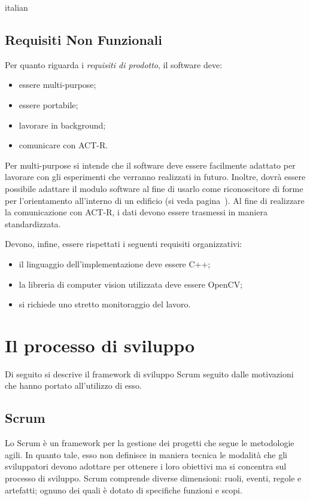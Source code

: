 \begin{otherlanguage*}{italian}
		\subsection*{Requisiti Non Funzionali}
			Per quanto riguarda i \emph{requisiti di prodotto}, il software deve:
			\begin{itemize}
				\item essere multi-purpose;
				\item essere portabile;
			   \item lavorare in background;			
				\item comunicare con \mbox{ACT-R}.			
			\end{itemize}
			
		Per multi-purpose si intende che il software deve essere facilmente adattato per lavorare con gli esperimenti che verranno realizzati in futuro.
		Inoltre, dovrà essere possibile adattare il modulo software al fine di usarlo come riconoscitore di forme per l'orientamento all'interno di un edificio (si veda pagina~\pageref{obiettivi}).
		Al fine di realizzare la comunicazione con \mbox{ACT-R}, i dati devono essere trasmessi in maniera standardizzata.

		Devono, infine, essere rispettati i seguenti requisiti organizzativi:
		\begin{itemize}
				\item il linguaggio dell'implementazione deve essere C++;
				\item la libreria di computer vision utilizzata deve essere \mbox{OpenCV};
			   \item si richiede uno stretto monitoraggio del lavoro.					
			\end{itemize}	

	\section*{Il processo di sviluppo}
		Di seguito si descrive il framework di sviluppo Scrum seguito dalle motivazioni che hanno portato all'utilizzo di esso.
		
		\subsection*{Scrum}
			Lo Scrum è un framework per la gestione dei progetti che segue le metodologie agili.
			In quanto tale, esso non definisce in maniera tecnica le modalità che gli sviluppatori devono adottare per ottenere i loro obiettivi ma si concentra sul processo di sviluppo.
			Scrum comprende diverse dimensioni: ruoli, eventi, regole e artefatti; ognuno dei quali è dotato di specifiche funzioni e scopi.
			

\end{otherlanguage*}
